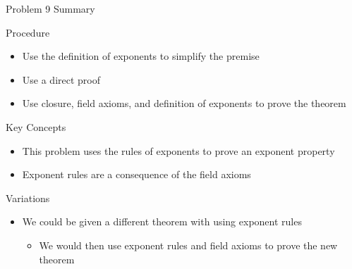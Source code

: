 \begin{summary}{Problem 9 Summary}
    \begin{statement}{Procedure}
        \begin{itemize}
            \item Use the definition of exponents to simplify the premise
            \item Use a direct proof
            \item Use closure, field axioms, and definition of exponents to prove the theorem
        \end{itemize}
    \end{statement}
    \begin{statement}{Key Concepts}
        \begin{itemize}
            \item This problem uses the rules of exponents to prove an exponent property
            \item Exponent rules are a consequence of the field axioms
        \end{itemize}
    \end{statement}
    \begin{statement}{Variations}
        \begin{itemize}
            \item We could be given a different theorem with using exponent rules
            \begin{itemize}
                \item We would then use exponent rules and field axioms to prove the new theorem
            \end{itemize}
        \end{itemize}
    \end{statement}
\end{summary}

